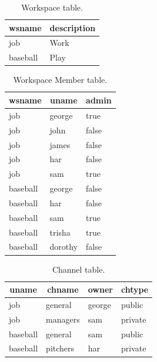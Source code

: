 \documentclass{article}
\begin{document}
\begin{table}[!p]
\centering
\begin{tabular}{l l}
\toprule
\multicolumn{1}{c}{wsname} &
\multicolumn{1}{c}{description} \\
\midrule
job & Work \\
baseball & Play \\
\bottomrule
\end{tabular}
\caption{Workspace table.}
\label{tbl:ws}
\end{table}

\begin{table}[!p]
\centering
\begin{tabular}{l l l}
\toprule
\multicolumn{1}{c}{wsname} &
\multicolumn{1}{c}{uname} &
\multicolumn{1}{c}{admin} \\
\midrule
job & george  & true   \\
job & john    & false  \\
job & james   & false  \\
job & har     & false  \\
job & sam     & true   \\
\midrule
baseball & george & false \\
baseball & har & false \\
baseball & sam & true \\
baseball & trisha  & true \\
baseball & dorothy & false \\
\bottomrule
\end{tabular}
\caption{Workspace Member table.}
\label{tbl:wsmember}
\end{table}

\begin{table}[!p]
\centering
\begin{tabular}{l l l l}
\toprule
\multicolumn{1}{c}{uname} &
\multicolumn{1}{c}{chname} &
\multicolumn{1}{c}{owner} &
\multicolumn{1}{c}{chtype} \\
\midrule
job & general & george & public \\
job & managers & sam & private \\
\midrule
baseball & general & sam & public \\
baseball & pitchers & har  & private \\
\bottomrule
\end{tabular}
\caption{Channel table.}
\label{tbl:channel}
\end{table}
\end{document}
